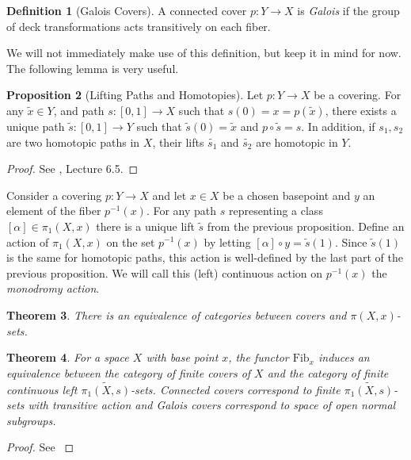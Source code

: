 \documentclass{article}
\newtheorem{theorem}{Theorem}[section]
\theoremstyle{definition}
\newtheorem{proposition}[theorem]{Proposition}
\newtheorem{definition}[theorem]{Definition}
\theoremstyle{remark}
\begin{document}
\begin{definition}[Galois Covers]
	A connected cover $p: Y \to X$ is \textit{Galois} if the group of deck transformations acts transitively on each fiber.
\end{definition}

We will not immediately make use of this definition, but keep it in mind for now.
The following lemma is very useful.

\begin{proposition}[Lifting Paths and Homotopies]	
	Let $p: Y \to X$ be a covering. 
	For any $\widetilde{x} \in Y$, and path $s: [0,1] \to X$ such that $s(0) = x = p(\widetilde{x})$, there exists a unique path $\widetilde{s}:[0,1] \to Y$ such that $\widetilde{s}(0) = \widetilde{x}$ and $p \circ \widetilde{s} = s$.
	In addition, if $s_1, s_2$ are two homotopic paths in $X$, their lifts $\widetilde{s_1}$ and $\widetilde{s_2}$ are homotopic in $Y$.
\end{proposition}

\begin{proof}
	See \cite{FomenkoFuchs}, Lecture 6.5.
\end{proof}
		
Consider a covering $p: Y \to X$ and let $x \in X$ be a chosen basepoint and $y$ an element of the fiber $p^{-1}(x)$.
	For any path $s$ representing a class $[\alpha] \in \pi_1(X,x)$ there is a unique lift $\widetilde{s}$ from the previous proposition.
	Define an action of $\pi_1(X,x)$ on the set $p^{-1}(x)$ by letting $[\alpha] \circ y = \widetilde{s}(1)$.
	Since $\widetilde{s}(1)$ is the same for homotopic paths, this action is well-defined by the last part of the previous proposition.
	We will call this (left) continuous action on $p^{-1}(x)$ the \textit{monodromy action}.\\

	
\begin{theorem}
	There is an equivalence of categories between covers and $\pi(X,x)$-sets.
\end{theorem}


\begin{theorem}
	For a space $X$ with base point $x$, the functor $\text{Fib}_x$ induces an equivalence between the category of finite covers of $X$ and the category of finite continuous left $\widetilde{\pi_1(X,s)}$-sets.
	Connected covers correspond to finite $\widetilde{\pi_1(X,s)}$-sets with transitive action and Galois covers correspond to space of open normal subgroups.
\end{theorem}
\begin{proof}
	See \cite{Szamuely}
\end{proof}
\end{document}
